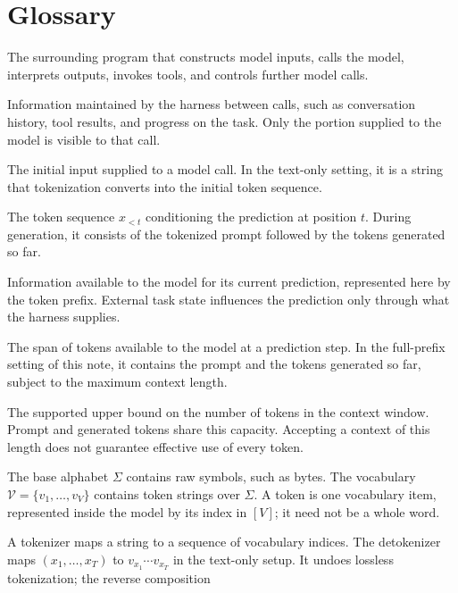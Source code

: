 \documentclass[11pt,twoside]{article}
\theoremstyle{plain}
\theoremstyle{definition}
\theoremstyle{remark}
\begin{document}
\clearpage

\section*{Glossary}

\begin{description}[style=nextline,leftmargin=1.5em,labelindent=0pt]
\item[Harness]
The surrounding program that constructs model inputs, calls the model,
interprets outputs, invokes tools, and controls further model calls.
\item[Task state]
Information maintained by the harness between calls, such as conversation
history, tool results, and progress on the task. Only the portion supplied
to the model is visible to that call.
\item[Prompt]
The initial input supplied to a model call. In the text-only setting, it is a
string that tokenization converts into the initial token sequence.
\item[Prefix]
The token sequence $x_{<t}$ conditioning the prediction at position $t$.
During generation, it consists of the tokenized prompt followed by the tokens
generated so far.
\item[Context]
Information available to the model for its current prediction, represented
here by the token prefix. External task state influences the prediction only
through what the harness supplies.
\item[Context window]
The span of tokens available to the model at a prediction step. In the
full-prefix setting of this note, it contains the prompt and the tokens
generated so far, subject to the maximum context length.
\item[Maximum context length]
The supported upper bound on the number of tokens in the context window.
Prompt and generated tokens share this capacity. Accepting a context of this
length does not guarantee effective use of every token.
\item[Base alphabet; vocabulary; token]
The base alphabet $\Sigma$ contains raw symbols, such as bytes. The vocabulary
$\mathcal V=\{v_1,\ldots,v_V\}$ contains token strings over $\Sigma$.
A token is one vocabulary item, represented inside the model by its index
in $[V]$; it need not be a whole word.
\item[Tokenizer; detokenizer]
A tokenizer maps a string to a sequence of vocabulary indices. The
detokenizer maps $(x_1,\ldots,x_T)$ to $v_{x_1}\cdots v_{x_T}$ in the
text-only setup. It undoes lossless tokenization; the reverse composition

\end{description}
\end{document}
